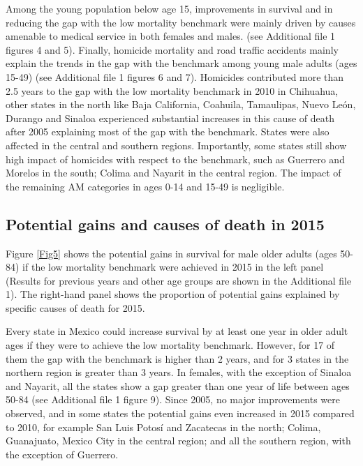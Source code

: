 \documentclass{bmcart}
\begin{document}
Among the young population below age 15, improvements in survival and in reducing the gap with the low mortality benchmark were mainly driven by causes amenable to medical service in both females and males.  (see Additional file 1 figures 4 and 5). Finally, homicide mortality and road traffic accidents mainly explain the trends in the gap with the benchmark among young male adults (ages 15-49) (see Additional file 1 figures 6 and 7). Homicides contributed more than 2.5 years to the gap with the low mortality benchmark in 2010 in Chihuahua, other states in the north like Baja California, Coahuila, Tamaulipas, Nuevo Le\'on, Durango and Sinaloa experienced substantial increases in this cause of death after 2005 explaining most of the gap with the benchmark. States were also affected in the central and southern regions. Importantly, some states still show high impact of homicides with respect to the benchmark, such as Guerrero and Morelos in the south; Colima and Nayarit in the central region.
The impact of the remaining  AM categories in ages 0-14 and 15-49 is negligible. \\

\subsection*{Potential gains and causes of death in 2015}

Figure \ref{Fig5} shows the potential gains in survival for male older adults (ages 50-84)  if the low mortality benchmark were achieved in 2015 in the left panel (Results for previous years and other age groups are shown in the Additional file 1). The right-hand panel shows the proportion of potential gains explained by specific causes of death for 2015.

Every state in Mexico could increase survival by at least one year in older adult ages if they were to achieve the low mortality benchmark. However, for 17 of them the gap with the benchmark is higher than 2 years, and for 3 states in the northern region is greater than 3 years. In females, with the exception of Sinaloa and Nayarit, all the states show a gap greater than one year of life between ages 50-84 (see Additional file 1 figure 9). Since 2005, no major improvements were observed, and in some states the potential gains even increased in 2015 compared to 2010, for example San Luis Potos\'i and Zacatecas in the north; Colima, Guanajuato, Mexico City in the central region; and all the southern region, with the exception of Guerrero. 
\end{document}

